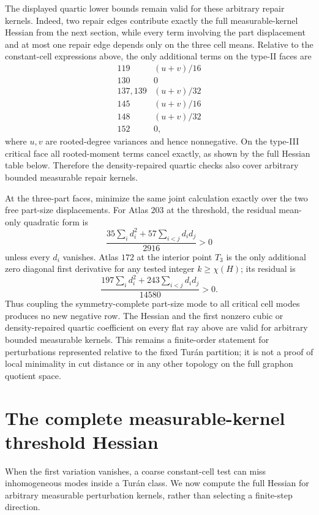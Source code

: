 \documentclass[11pt]{article}
\begin{document}
The displayed quartic lower bounds remain valid for these arbitrary repair
kernels.  Indeed, two repair edges contribute exactly the full
measurable-kernel Hessian from the next section, while every term involving
the part displacement and at most one repair edge depends only on the three
cell means.  Relative to the constant-cell expressions above, the only
additional terms on the type-II faces are
\[
\begin{array}{c|c}
119&(u+v)/16\\
130&0\\
137,139&(u+v)/32\\
145&(u+v)/16\\
148&(u+v)/32\\
152&0,
\end{array}
\]
where $u,v$ are rooted-degree variances and hence nonnegative.  On the
type-III critical face all rooted-moment terms cancel exactly, as shown by
the full Hessian table below.  Therefore the density-repaired quartic checks
also cover arbitrary bounded measurable repair kernels.

At the three-part faces, minimize the same joint calculation exactly over
the two free part-size displacements.  For Atlas $203$ at the threshold, the
residual mean-only quadratic form is
\[
 \frac{35\sum_i d_i^2+57\sum_{i<j}d_id_j}{2916}>0
\]
unless every $d_i$ vanishes.  Atlas $172$ at the interior point $T_3$ is the
only additional zero diagonal first derivative for any tested integer
$k\geq\chi(H)$; its residual is
\[
 \frac{197\sum_i d_i^2+243\sum_{i<j}d_id_j}{14580}>0.
\]
Thus coupling the symmetry-complete part-size mode to all critical cell
modes produces no new negative row.  The Hessian and the first nonzero
cubic or density-repaired quartic coefficient on every flat ray above are
valid for arbitrary bounded measurable kernels.  This remains a
finite-order statement for perturbations represented relative to the fixed
Tur\'an partition; it is not a proof of local minimality in cut distance or
in any other topology on the full graphon quotient space.


\section{The complete measurable-kernel threshold Hessian}

When the first variation vanishes, a coarse constant-cell test can miss
inhomogeneous modes inside a Tur\'an class.  We now compute the full Hessian
for arbitrary measurable perturbation kernels, rather than selecting a
finite-step direction.
\end{document}
